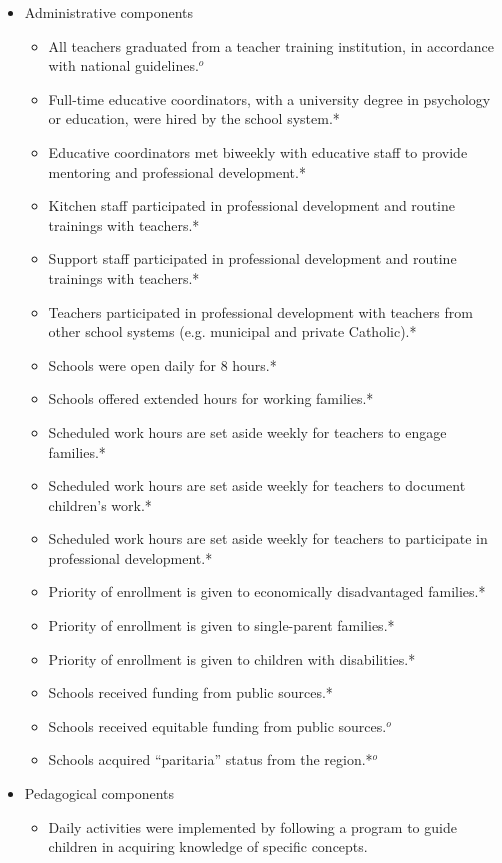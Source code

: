 \documentclass[12pt]{article}
\begin{document}
\begin{itemize}
 \item Administrative components
 \begin{itemize}
 	\item All teachers graduated from a teacher training institution, in accordance with national guidelines.$^o$
 	\item Full-time educative coordinators, with a university degree in psychology or education, were hired by the school system.*
 	\item Educative coordinators met biweekly with educative staff to provide mentoring and professional development.*
 	\item Kitchen staff participated in professional development and routine trainings with teachers.*
 	\item Support staff participated in professional development and routine trainings with teachers.*
 	\item Teachers participated in professional development with teachers from other school systems (e.g. municipal and private Catholic).*
 	\item Schools were open daily for 8 hours.*
 	\item Schools offered extended hours for working families.*
 	\item Scheduled work hours are set aside weekly for teachers to engage families.*
 	\item Scheduled work hours are set aside weekly for teachers to document children's work.*
 	\item Scheduled work hours are set aside weekly for teachers to participate in professional development.*
 	\item Priority of enrollment is given to economically disadvantaged families.*
 	\item Priority of enrollment is given to single-parent families.*
 	\item Priority of enrollment is given to children with disabilities.*
 	\item Schools received funding from public sources.*
	\item Schools received equitable funding from public sources.$^o$
	\item Schools acquired ``paritaria'' status from the region.*$^o$
 \end{itemize}
 \item Pedagogical components
 \begin{itemize}
 	\item Daily activities were implemented by following a program to guide children in acquiring knowledge of specific concepts.

\end{itemize}
\end{itemize}
\end{document}
